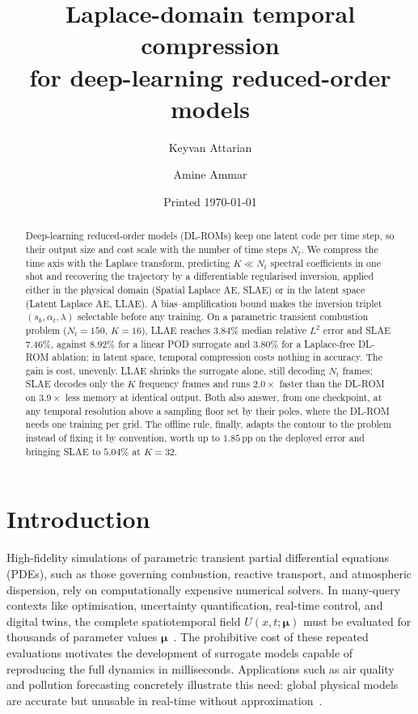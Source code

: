 ﻿\documentclass[a4paper,12pt]{article}
\title{Laplace-domain temporal compression\\for deep-learning reduced-order models}
\author[1,3]{Keyvan Attarian}
\author[2,3]{Amine Ammar}
\affil[1]{\'{E}cole polytechnique, Institut Polytechnique de Paris}
\affil[2]{LAMPA Laboratory \& ESI Group Chair, Arts et Metiers Institute of Technology}
\affil[3]{DesCartes Program, WP8, CNRS@CREATE}
\date{Printed \today}
\theoremstyle{definition}
\theoremstyle{remark}
\newcommand{\vmu}{\bm{\mu}}
\begin{document}
\sloppy

\maketitle

\setcounter{tocdepth}{1}

\begin{abstract}
Deep-learning reduced-order models (DL-ROMs) keep one latent code per time step, so their output size and cost scale with the number of time steps $N_t$. We compress the time axis with the Laplace transform, predicting $K \ll N_t$ spectral coefficients in one shot and recovering the trajectory by a differentiable regularised inversion, applied either in the physical domain (Spatial Laplace AE, SLAE) or in the latent space (Latent Laplace AE, LLAE). A bias--amplification bound makes the inversion triplet $(s_k, \alpha_t, \lambda)$ selectable before any training. On a parametric transient combustion problem ($N_t = 150$, $K = 16$), LLAE reaches $3.84\%$ median relative $L^2$ error and SLAE $7.46\%$, against $8.92\%$ for a linear POD surrogate and $3.80\%$ for a Laplace-free DL-ROM ablation: in latent space, temporal compression costs nothing in accuracy. The gain is cost, unevenly. LLAE shrinks the surrogate alone, still decoding $N_t$ frames; SLAE decodes only the $K$ frequency frames and runs $2.0\times$ faster than the DL-ROM on $3.9\times$ less memory at identical output. Both also answer, from one checkpoint, at any temporal resolution above a sampling floor set by their poles, where the DL-ROM needs one training per grid. The offline rule, finally, adapts the contour to the problem instead of fixing it by convention, worth up to $1.85$\,pp on the deployed error and bringing SLAE to $5.04\%$ at $K = 32$.
\end{abstract}

\makeatletter
{\renewcommand*\addvspace[1]{\vskip 0.7em\relax}\tableofcontents}
\makeatother
\newpage

\section{Introduction}

High-fidelity simulations of parametric transient partial differential equations (PDEs), such as those governing combustion, reactive transport, and atmospheric dispersion, rely on computationally expensive numerical solvers. In many-query contexts like optimisation, uncertainty quantification, real-time control, and digital twins, the complete spatiotemporal field $U(x, t; \vmu)$ must be evaluated for thousands of parameter values $\vmu$~\cite{giacomini2026,mallick2025}. The prohibitive cost of these repeated evaluations motivates the development of surrogate models capable of reproducing the full dynamics in milliseconds. Applications such as air quality and pollution forecasting concretely illustrate this need: global physical models are accurate but unusable in real-time without approximation~\cite{guo2022,fan2025}.
\end{document}

